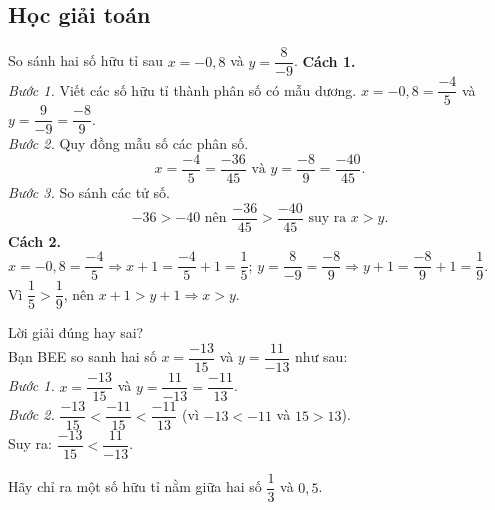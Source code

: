 \subsection{Học giải toán}
\begin{vd}%
	So sánh hai số hữu tỉ sau $x=-0,8$ và $y=\dfrac{8}{-9}$.
\loigiai
{
	\textbf{Cách 1.} \\
	\textit{Bước 1.} Viết các số hữu tỉ thành phân số có mẫu dương. $x = -0,8 =\dfrac{-4}{5}$ và $y=\dfrac{9}{-9}=\dfrac{-8}{9}$.\\
	\textit{Bước 2.} Quy đồng mẫu số các phân số.
	$$ x=\dfrac{-4}{5}=\dfrac{-36}{45} \text{ và } y=\dfrac{-8}{9}=\dfrac{-40}{45}.$$
	\textit{Bước 3.} So sánh các tử số.
	$$-36>-40 \text{ nên } \dfrac{-36}{45} > \dfrac{-40}{45} \text{ suy ra } x>y.$$
	\textbf{Cách 2.} \\
	$x=-0,8 = \dfrac{-4}{5} \Rightarrow x+1=\dfrac{-4}{5}+1=\dfrac{1}{5}$; $y=\dfrac{8}{-9}=\dfrac{-8}{9} \Rightarrow y+1=\dfrac{-8}{9}+1=\dfrac{1}{9}$.\\
	Vì $\dfrac{1}{5}>\dfrac{1}{9}$, nên $x+1 > y+1 \Rightarrow x>y$.
}
\end{vd}
\begin{vd}%
	Lời giải đúng hay sai?\\
	Bạn BEE so sanh hai số $x = \dfrac{-13}{15}$ và $y =\dfrac{11}{-13}$ như sau: \\
	\textit{Bước 1.} $x=\dfrac{-13}{15}$ và $y=\dfrac{11}{-13} = \dfrac{-11}{13}$.\\
	\textit{Bước 2.} $\dfrac{-13}{15}<\dfrac{-11}{15}<\dfrac{-11}{13}$ (vì $-13 < -11$ và $15>13$).\\
	Suy ra: $\dfrac{-13}{15} < \dfrac{11}{-13}$.
\end{vd}
\begin{vd}%
	Hãy chỉ ra một số hữu tỉ nằm giữa hai số $\dfrac{1}{3}$ và $0,5$.
\end{vd}
